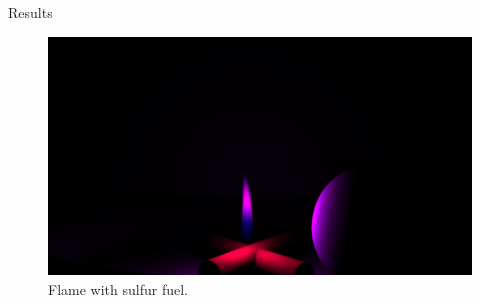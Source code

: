 \documentclass{beamer}
\begin{document}
\begin{frame}[allowframebreaks]{Results}
\begin{figure}[p]
\begin{center}
\includegraphics[width=\textwidth, trim={8cm 0 8cm 10cm}, clip]{img/result_sulfur}
\caption*{\tiny{Flame with sulfur fuel.}}
\end{center}
\end{figure}


\end{frame}
\end{document}
